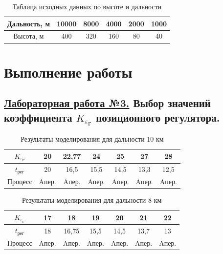\begin{table}[H]
    \centering
    \caption{Таблица исходных данных по высоте и дальности}
    \begin{tabular}{|c|c|c|c|c|c|}
    \hline
        Дальность, м & 10000 & 8000 & 4000 & 2000 & 1000 \\ \hline
        Высота, м & 400 & 320 & 160 & 80 & 40\\ \hline
    \end{tabular}
    \label{tab:InitialData}
\end{table}

\section{Выполнение работы}

\begin{center}
    \subsection*{\underline{ Лабораторная работа №3.} Выбор значений коэффициента $K_{\varepsilon_\text{Г}}$
позиционного регулятора.}
\end{center}

\begin{table}[H]
    \centering
    \caption{Результаты моделирования для дальности 10 км}
    \begin{tabular}{c|c|c|c|c|c|c}
    \hline
        $K_{\varepsilon_\text{Г}}$& 20  & 22,77 & 24 & 25 & 27 &\cellcolor{cyan}28\\ \hline
        $t_\text{рег}$& 20 & 16,5 & 15,5 & 14,5 & 13,3 &\cellcolor{cyan}12,5\\ \hline
        Процесс& Aпер. & Aпер. & Aпер. & Aпер. & Aпер. &\cellcolor{cyan}Aпер.\\ \hline
    \end{tabular}
    \label{tab:10KM}
\end{table}

\begin{table}[H]
    \centering
    \caption{Результаты моделирования для дальности 8 км}
    \begin{tabular}{c|c|c|c|c|c|c}
    \hline
        $K_{\varepsilon_\text{Г}}$& 17  & 18 & 19& 20 & 21 &\cellcolor{cyan}22\\ \hline
        $t_\text{рег}$& 18 & 16,75 & 15,5 & 14,5 & 13,7 &\cellcolor{cyan}13\\ \hline
        Процесс& Aпер. & Aпер. & Aпер. & Aпер. & Aпер. &\cellcolor{cyan}Aпер.\\ \hline
    \end{tabular}
    \label{tab:10KM}
\end{table}

